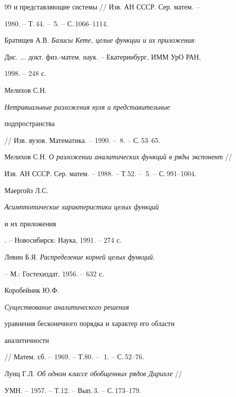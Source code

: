 \begin{thebibliography}{99}
{и представляющие системы} // Изв. АН СССР. Сер. матем. -- 


1980. -- Т.\,44. -- \No\,5. -- С.\,1066--1114.




Братищев А.В. {\em Базисы Кете, целые функции и их приложения}:


Дис. $\dotsc$ докт. физ.-матем. наук. -- Екатеринбург, ИММ УрО РАН,


1998. -- 248 с.




Мелихов С.Н. {\em Нетривиальные разложения нуля и представительные 


подпространства} // Изв. вузов. Математика. -- 1990. -- \No\,8. -- С.\,53--65.




Мелихов С.Н. {\em О разложении аналитических функций в ряды экспонент} //


Изв. АН СССР. Сер. матем. -- 1988. -- Т.52. -- \No\,5. -- С.\,991--1004.




Маергойз Л.С. {\em Асимптотические характеристики целых функций


и их приложения}. -- Новосибирск: Наука, 1991. -- 274 с.




Левин Б.Я. {\em Распределение корней целых функций}.


-- М.: Гостехиздат, 1956. -- 632 с.




Коробейник Ю.Ф. {\em Существование аналитического решения


уравнения бесконечного порядка и характер его области


аналитичности} // Матем. сб. -- 1969. -- Т.80. -- \No\,\,1. -- С.\,52--76.




Лунц Г.Л. {\em Об одном классе обобщенных рядов Дирихле} //


УМН. -- 1957. -- Т.12. -- Вып.\,3. -- С.\,173--179.





\end{thebibliography}





\vskip 0.5cm





